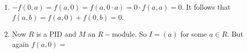 \begin{sol}
\begin{enumerate}[label=(\alph*)]
\item $-f(0,a) = f(a,0) = f(a,0\cdot a) = 0\cdot f(a,a) = 0$. It follows that $f(a,b) = f(a,0)+f(0,b) = 0$.
\item Now $R$ is a PID and $M$ an $R-$module. So $I=(a)$ for some $a\in R$. But again $f(a,0) = $
\end{enumerate}
\end{sol}